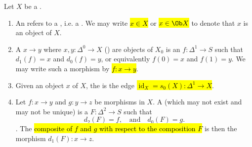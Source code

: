 \begin{definition} \label{definition:categorical_terminology_for_simplices_in_a_simplicial_set_objects_morphisms_compositions_of_morphisms_in_a_simplicial_set}
    Let $X$ be a . 
    \begin{enumerate}
        \item An  refers to a , i.e. a . We may write \hl{$x \in X$} or \hl{$x \in \Ob X$} to denote that $x$ is an object of $X$. 

        \item A  $x \to y$ where $x,y: \Delta^0 \to X$ () are objects of $X_0$ is an  $f:\Delta^1 \to S$ such that $d_1(f) = x$ and $d_0(f) = y$, or equivalently $f(0) = x$ and $f(1) = y$. We may write such a morphism by \hl{$f: x \to y$}.

        \item Given an object $x$ of $X$, the  is the edge \hl{$\operatorname{id}_X = s_0(X): \Delta^1 \to X$}. 

        \item Let $f: x \to y$ and $g: y \to z$ be morphisms in $X$. A  (which may not exist and may not be unique) is a  $F: \Delta^2 \to S$ such that  
        $$d_2(F) = f, \quad \text{and} \quad d_0(F) = g.$$
        . The \hl{composite of $f$ and $g$ with respect to the composition $F$} is then the morphism $d_1(F): x \to z$. 



\end{enumerate}
\end{definition}
